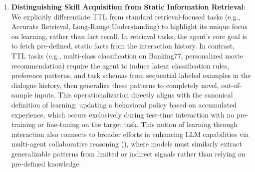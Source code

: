 \begin{enumerate}
    \item \textbf{Distinguishing Skill Acquisition from Static Information Retrieval}: We explicitly differentiate TTL from standard retrieval-focused tasks (e.g., Accurate Retrieval, Long-Range Understanding) to highlight its unique focus on learning, rather than fact recall. In retrieval tasks, the agent's core goal is to fetch pre-defined, static facts from the interaction history. In contrast, TTL tasks (e.g., multi-class classification on Banking77, personalized movie recommendation) require the agent to induce latent classification rules, preference patterns, and task schemas from sequential labeled examples in the dialogue history, then generalize these patterns to completely novel, out-of-sample inputs. This operationalization directly aligns with the canonical definition of learning: updating a behavioral policy based on accumulated experience, which occurs exclusively during test-time interaction with no pre-training or fine-tuning on the target task. This notion of learning through interaction also connects to broader efforts in enhancing LLM capabilities via multi-agent collaborative reasoning (\cite{li2026draftrl}), where models must similarly extract generalizable patterns from limited or indirect signals rather than relying on pre-defined knowledge.



\end{enumerate}
